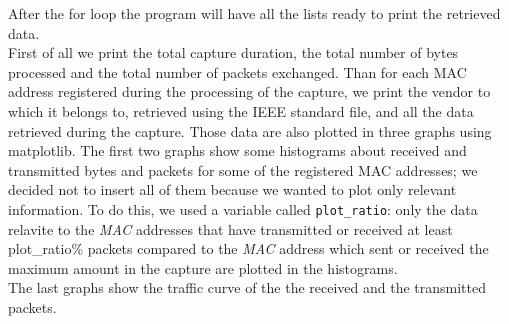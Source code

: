 After the for loop the program will have all the lists ready to print the retrieved data.\\ 
First of all we print the total capture duration, the total number of bytes processed and the total 
number of packets exchanged. Than for each MAC address registered during the processing of the capture, 
we print the vendor to which it belongs to, retrieved using the IEEE standard file, and all the 
data retrieved during the capture. Those data are also plotted in three graphs using matplotlib.
The first two graphs show some histograms about received and transmitted bytes and packets for
some of the registered MAC addresses; we decided not to insert all of them because we wanted to plot 
only relevant information. To do this, we used a variable called \texttt{plot\_ratio}: only the data relavite to 
the \textit{MAC} addresses that have transmitted or received at least plot\_ratio\% packets compared to the 
\textit{MAC} address which sent or received the maximum amount in the capture are plotted in the histograms.\\
The last graphs show the traffic curve of the the received and the transmitted packets.

